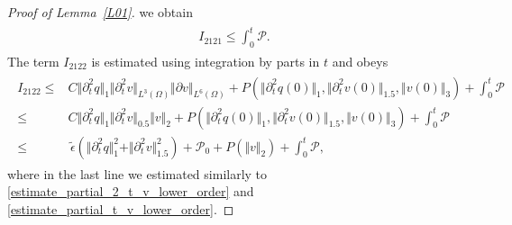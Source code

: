 \documentclass[10pt,reqno]{amsart}
\theoremstyle{plain}
\theoremstyle{definition}
\numberwithin{equation}{section}
\newcommand{\ccP}{\mathscr{P}}
\newcommand{\ccPz}{\mathscr{P}_0}
\newcommand{\Om}{\Omega}
\newcommand{\norm}[1]{\Vert#1\Vert}
\begin{document}
\begin{proof}[Proof of Lemma~\ref{L01}]
we obtain
\begin{align}
\begin{split}
I_{2121} \leq  \int_0^t \ccP
   .
\end{split}
\label{estimate_I_2121}
\end{align}
The term $I_{2122}$ is estimated 
using integration by parts in $t$
and obeys
\begin{align}
\begin{split}
I_{2122} \leq & 
C \norm{\partial^2_t q}_1 \norm{\partial^2_t v}_{L^3(\Omega)}
\norm{\partial v}_{L^6(\Om)}
+
P(
\norm{\partial^2_t q(0)}_1, \norm{\partial^2_t v(0)}_{1.5}, \norm{v(0)}_3)
+ \int_0^t \ccP 
\\
\leq 
&
C \norm{\partial^2_t q}_1 \norm{\partial^2_t v}_{0.5} \norm{v}_2
+
P(
\norm{\partial^2_t q(0)}_1, \norm{\partial^2_t v(0)}_{1.5}, \norm{v(0)}_3)
+ \int_0^t \ccP
\\
\leq &
\,
\widetilde{\epsilon} ( \norm{\partial^2_t q}^2_1 
+ \norm{\partial^2_t v}^2_{1.5} ) 
+
\ccPz
+ P(\norm{v}_{2}) 
+ \int_0^t \ccP,
\end{split}
\label{estimate_I_2122}
\end{align}
where in the last line we estimated similarly to \eqref{estimate_partial_2_t_v_lower_order} and 
\eqref{estimate_partial_t_v_lower_order}.


\end{proof}
\end{document}

